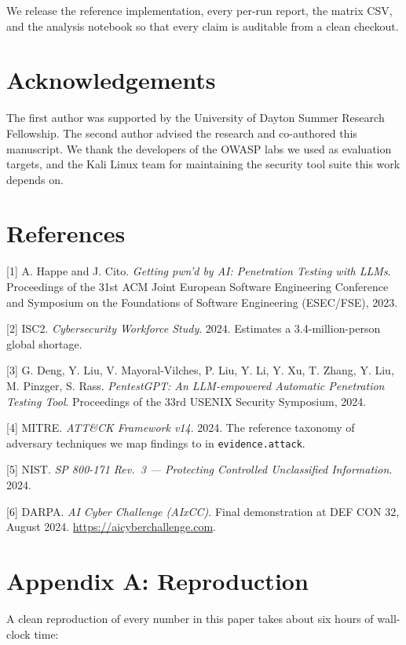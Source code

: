 \documentclass[
]{article}
\begin{document}
We release the reference implementation, every per-run report, the
matrix CSV, and the analysis notebook so that every claim is auditable
from a clean checkout.

\section{Acknowledgements}\label{acknowledgements}

The first author was supported by the University of Dayton Summer
Research Fellowship. The second author advised the research and
co-authored this manuscript. We thank the developers of the OWASP labs
we used as evaluation targets, and the Kali Linux team for maintaining
the security tool suite this work depends on.

\section{References}\label{references}

{[}1{]} A. Happe and J. Cito. \emph{Getting pwn'd by AI: Penetration
Testing with LLMs}. Proceedings of the 31st ACM Joint European Software
Engineering Conference and Symposium on the Foundations of Software
Engineering (ESEC/FSE), 2023.

{[}2{]} ISC2. \emph{Cybersecurity Workforce Study}. 2024. Estimates a
3.4-million-person global shortage.

{[}3{]} G. Deng, Y. Liu, V. Mayoral-Vilches, P. Liu, Y. Li, Y. Xu, T.
Zhang, Y. Liu, M. Pinzger, S. Rass. \emph{PentestGPT: An LLM-empowered
Automatic Penetration Testing Tool}. Proceedings of the 33rd USENIX
Security Symposium, 2024.

{[}4{]} MITRE. \emph{ATT\&CK Framework v14}. 2024. The reference
taxonomy of adversary techniques we map findings to in
\texttt{evidence.attack}.

{[}5{]} NIST. \emph{SP 800-171 Rev.~3 --- Protecting Controlled
Unclassified Information}. 2024.

{[}6{]} DARPA. \emph{AI Cyber Challenge (AIxCC)}. Final demonstration at
DEF CON 32, August 2024. \url{https://aicyberchallenge.com}.

\section{Appendix A: Reproduction}\label{appendix-a-reproduction}

A clean reproduction of every number in this paper takes about six hours
of wall-clock time:
\end{document}
